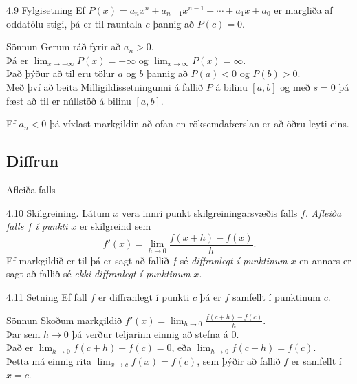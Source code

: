 \documentclass[icelandic,a4paper,12pt]{article}
\begin{document}
\begin{frame} 
 \begin{block}{4.9 Fylgisetning}
Ef $P(x)=a_nx^n+a_{n-1}x^{n-1}+\cdots+a_1x+a_0$ er margliða af
oddatölu stigi, þá er til rauntala $c$ þannig að $P(c)=0$.
 \end{block}
 \pause
 \begin{block}{Sönnun}
	Gerum ráð fyrir að $a_n>0$. \\\pause
	Þá er $\lim_{x\to -\infty} P(x) = -\infty$ og
	$\lim_{x\to \infty} P(x) = \infty$.\\\pause
	Það þýður að til eru tölur $a$ og $b$ 
	þannig að $P(a)<0$ og $P(b)>0$. \\\pause
	Með því að beita Milligildissetningunni á fallið $P$ á 
	bilinu $[a,b]$ og með $s=0$ þá fæst að til er núllstöð 
	á bilinu $[a,b]$.\\\pause
	
	Ef $a_n < 0$ þá víxlast markgildin að ofan en röksemdafærslan er
	að öðru leyti eins.
 \end{block}
\end{frame}

\bigskip

\subsection*{Diffrun}

\begin{frame}{Afleiða falls}
 \begin{block}{4.10 Skilgreining.}  Látum $x$ vera innri punkt
skilgreiningarsvæðis falls $f$. {\em Afleiða falls $f$ í punkti} $x$
er skilgreind sem 
$$f'(x)=\lim_{h\rightarrow 0}\frac{f(x+h)-f(x)}{h}.$$
Ef markgildið er til þá er sagt að fallið $f$ sé {\em diffranlegt í
punktinum} $x$ en annars er sagt að fallið sé {\em ekki diffranlegt í
punktinum} $x$.
\end{block}

\pause

\begin{block}{4.11 Setning}
Ef fall $f$ er diffranlegt í punkti $c$ þá er $f$ samfellt í punktinum
$c$.
\end{block}
\pause
\begin{block}{Sönnun}
Skoðum markgildið $f'(x)=\lim_{h\to 0} \frac{f(c+h)-f(c)}{h}$. \\\pause
Þar sem $h\to 0$ þá verður teljarinn einnig að stefna á 0. \\\pause
Það er $\lim_{h \to 0} f(c+h)-f(c) = 0$, eða $\lim_{h \to 0} f(c+h) = f(c)$.\\\pause
Þetta má einnig rita $\lim_{x \to c} f(x) = f(c)$, sem þýðir að
fallið $f$ er samfellt í $x=c$.
\end{block}
\end{frame}
\end{document}
